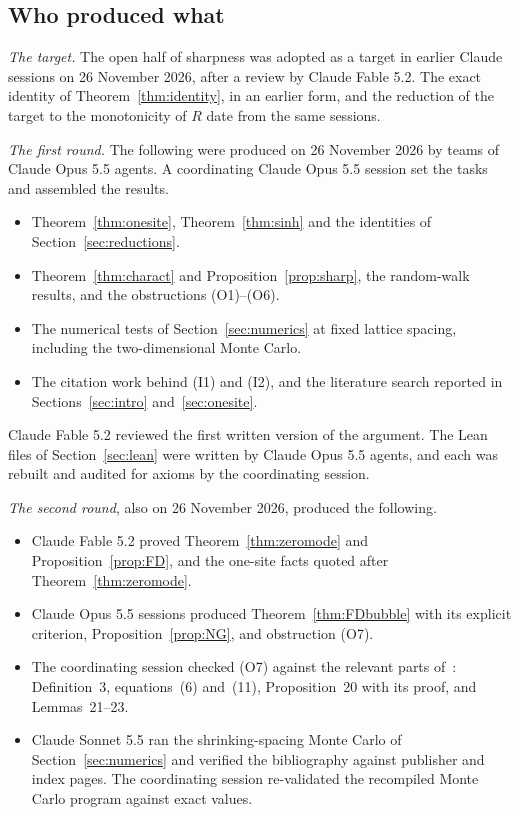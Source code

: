 \subsection{Who produced what}\label{sec:who}
\emph{The target.} The open half of sharpness was adopted as a target in earlier Claude sessions on 26 November 2026, after a review by Claude Fable 5.2. The exact identity of Theorem~\ref{thm:identity}, in an earlier form, and the reduction of the target to the monotonicity of $R$ date from the same sessions.

\emph{The first round.} The following were produced on 26 November 2026 by teams of Claude Opus 5.5 agents. A coordinating Claude Opus 5.5 session set the tasks and assembled the results.
\begin{itemize}
\item Theorem~\ref{thm:onesite}, Theorem~\ref{thm:sinh} and the identities of Section~\ref{sec:reductions}.
\item Theorem~\ref{thm:charact} and Proposition~\ref{prop:sharp}, the random-walk results, and the obstructions (O1)--(O6).
\item The numerical tests of Section~\ref{sec:numerics} at fixed lattice spacing, including the two-dimensional Monte Carlo.
\item The citation work behind (I1) and (I2), and the literature search reported in Sections~\ref{sec:intro} and~\ref{sec:onesite}.
\end{itemize}
Claude Fable 5.2 reviewed the first written version of the argument. The Lean files of Section~\ref{sec:lean} were written by Claude Opus 5.5 agents, and each was rebuilt and audited for axioms by the coordinating session.

\emph{The second round}, also on 26 November 2026, produced the following.
\begin{itemize}
\item Claude Fable 5.2 proved Theorem~\ref{thm:zeromode} and Proposition~\ref{prop:FD}, and the one-site facts quoted after Theorem~\ref{thm:zeromode}.
\item Claude Opus 5.5 sessions produced Theorem~\ref{thm:FDbubble} with its explicit criterion, Proposition~\ref{prop:NG}, and obstruction (O7).
\item The coordinating session checked (O7) against the relevant parts of~\cite{vEHL26}: Definition~3, equations~(6) and~(11), Proposition~20 with its proof, and Lemmas~21--23.
\item Claude Sonnet 5.5 ran the shrinking-spacing Monte Carlo of Section~\ref{sec:numerics} and verified the bibliography against publisher and index pages. The coordinating session re-validated the recompiled Monte Carlo program against exact values.
\end{itemize}


